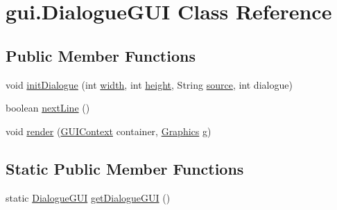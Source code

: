 \hypertarget{classgui_1_1_dialogue_g_u_i}{}\section{gui.\+Dialogue\+G\+UI Class Reference}
\label{classgui_1_1_dialogue_g_u_i}
\subsection*{Public Member Functions}
\begin{DoxyCompactItemize}
\item 
void \mbox{\hyperlink{classgui_1_1_dialogue_g_u_i_a3badcdab9688173faa3d1087eb6e735e}{init\+Dialogue}} (int \mbox{\hyperlink{classgui_1_1_dialogue_g_u_i_a62770f57482703fba82e5e885b8f60cc}{width}}, int \mbox{\hyperlink{classgui_1_1_dialogue_g_u_i_a41a3d504adf0501b3c0b15ce1f046fa8}{height}}, String \mbox{\hyperlink{classgui_1_1_dialogue_g_u_i_ae6b546f672ac2bbfc0a9f5105ce9e2a9}{source}}, int dialogue)
\item 
boolean \mbox{\hyperlink{classgui_1_1_dialogue_g_u_i_a44bb149e1e51c69ba5c65b34cc1dfc3f}{next\+Line}} ()
\item 
void \mbox{\hyperlink{classgui_1_1_dialogue_g_u_i_a2163a61f391f8c158ae232af0ec7467d}{render}} (\mbox{\hyperlink{interfaceorg_1_1newdawn_1_1slick_1_1gui_1_1_g_u_i_context}{G\+U\+I\+Context}} container, \mbox{\hyperlink{classorg_1_1newdawn_1_1slick_1_1_graphics}{Graphics}} g)
\end{DoxyCompactItemize}
\subsection*{Static Public Member Functions}
\begin{DoxyCompactItemize}
\item 
static \mbox{\hyperlink{classgui_1_1_dialogue_g_u_i}{Dialogue\+G\+UI}} \mbox{\hyperlink{classgui_1_1_dialogue_g_u_i_a274435a784994cf896865d71e3e6f5a3}{get\+Dialogue\+G\+UI}} ()
\end{DoxyCompactItemize}
